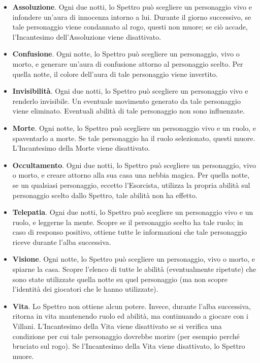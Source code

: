 \documentclass[a4paper,10pt]{article}
\begin{document}
\begin{itemize}

	\item {\bf Assoluzione}. Ogni due notti, lo Spettro può scegliere un personaggio vivo e infondere un'aura di innocenza intorno a lui. Durante il giorno successivo, se tale personaggio viene condannato al rogo, questi non muore; se ciò accade, l'Incantesimo dell'Assoluzione viene disattivato.

	\item {\bf Confusione}. Ogni notte, lo Spettro può scegliere un personaggio, vivo o morto, e generare un'aura di confusione attorno al personaggio scelto. Per quella notte, il colore dell'aura di tale personaggio viene invertito.

	\item {\bf Invisibilità}. Ogni due notti, lo Spettro può scegliere un personaggio vivo e renderlo invisibile. Un eventuale movimento generato da tale personaggio viene eliminato. Eventuali abilità di tale personaggio non sono influenzate.

	\item {\bf Morte}. Ogni notte, lo Spettro può scegliere un personaggio vivo e un ruolo, e spaventarlo a morte. Se tale personaggio ha il ruolo selezionato, questi muore. L'Incantesimo della Morte viene disattivato.

	\item {\bf Occultamento}. Ogni due notti, lo Spettro può scegliere un personaggio, vivo o morto, e creare attorno alla sua casa una nebbia magica. Per quella notte, se un qualsiasi personaggio, eccetto l'Esorcista, utilizza la propria abilità sul personaggio scelto dallo Spettro, tale abilità non ha effetto.

	\item {\bf Telepatia}. Ogni due notti, lo Spettro può scegliere un personaggio vivo e un ruolo, e leggerne la mente. Scopre se il personaggio scelto ha tale ruolo; in caso di responso positivo, ottiene tutte le informazioni che tale personaggio riceve durante l'alba successiva.

	\item {\bf Visione}. Ogni notte, lo Spettro può scegliere un personaggio, vivo o morto, e spiarne la casa. Scopre l'elenco di tutte le abilità (eventualmente ripetute) che sono state utilizzate quella notte su quel personaggio (ma non scopre l'identità dei giocatori che le hanno utilizzate).

	\item {\bf Vita}. Lo Spettro non ottiene alcun potere. Invece, durante l'alba successiva, ritorna in vita mantenendo ruolo ed abilità, ma continuando a giocare con i Villani. L'Incantesimo della Vita viene disattivato se si verifica una condizione per cui tale personaggio dovrebbe morire (per esempio perché bruciato sul rogo). Se l'Incantesimo della Vita viene disattivato, lo Spettro muore.

\end{itemize}
\end{document}
